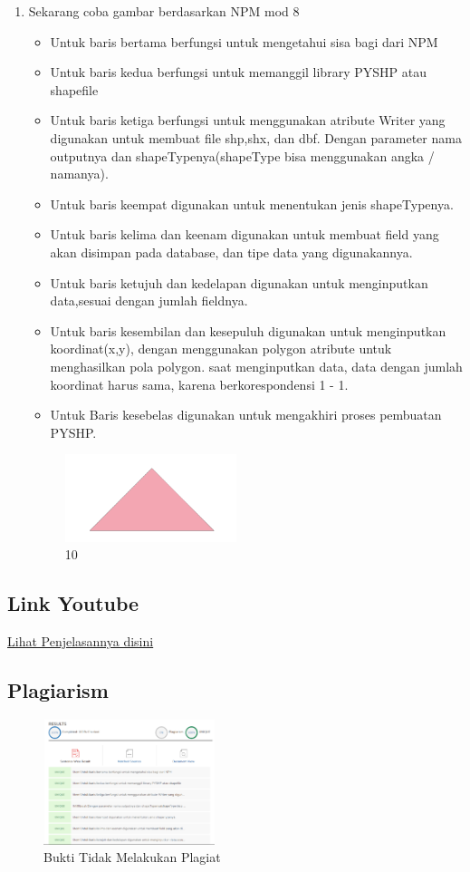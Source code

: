 \begin{enumerate}
	\item Sekarang coba gambar berdasarkan NPM mod 8
	
	\begin{itemize}
		\item Untuk baris bertama berfungsi untuk mengetahui sisa bagi dari NPM
		\item Untuk baris kedua berfungsi untuk memanggil library PYSHP atau shapefile
		\item Untuk baris ketiga berfungsi untuk menggunakan atribute Writer yang digunakan untuk membuat file shp,shx, dan dbf. \hfill\break Dengan parameter nama outputnya dan shapeTypenya(shapeType bisa menggunakan angka / namanya).
		\item Untuk baris keempat digunakan untuk menentukan jenis shapeTypenya.
		\item Untuk baris kelima dan keenam digunakan untuk membuat field yang akan disimpan pada database, dan tipe data yang digunakannya.
		\item Untuk baris ketujuh dan kedelapan digunakan untuk menginputkan data,sesuai dengan jumlah fieldnya.
		\item Untuk baris kesembilan dan kesepuluh digunakan untuk menginputkan koordinat(x,y), dengan menggunakan polygon atribute untuk menghasilkan pola polygon. \hfill\break
		saat menginputkan data, data dengan jumlah koordinat harus sama, karena berkorespondensi 1 - 1.
		\item Untuk Baris kesebelas digunakan untuk mengakhiri proses pembuatan PYSHP.
	\end{itemize}
	\hfill\break
	\begin{figure}[H]
		\includegraphics[width=5cm]{figures/1174009/2/10.png}
		\centering
		\caption{10}
	\end{figure}
\end{enumerate}
\subsection{Link Youtube}
\href{https://youtu.be/6xmSSBICOto}{Lihat Penjelasannya disini}
\subsection{Plagiarism}
\begin{figure}[H]
	\includegraphics[width=5cm]{figures/1174009/2/bukti.png}
	\centering
	\caption{Bukti Tidak Melakukan Plagiat}
\end{figure}